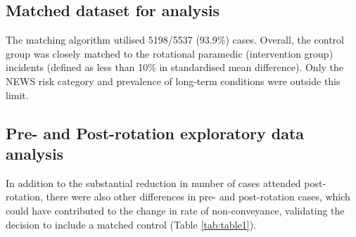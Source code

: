 \documentclass[
  a4paper,
  openany]{article}
\begin{document}
\hypertarget{matched-dataset-for-analysis}{%
\subsection*{Matched dataset for analysis}\label{matched-dataset-for-analysis}}

The matching algorithm utilised 5198/5537 (93.9\%) cases. Overall, the control group was closely matched to the rotational paramedic (intervention group) incidents (defined as less than 10\% in standardised mean difference). Only the NEWS risk category and prevalence of long-term conditions were outside this limit.

\hypertarget{pre--and-post-rotation-exploratory-data-analysis}{%
\subsection*{Pre- and Post-rotation exploratory data analysis}\label{pre--and-post-rotation-exploratory-data-analysis}}

In addition to the substantial reduction in number of cases attended post-rotation, there were also other differences in pre- and post-rotation cases, which could have contributed to the change in rate of non-conveyance, validating the decision to include a matched control (Table \ref{tab:table1}).
\end{document}
